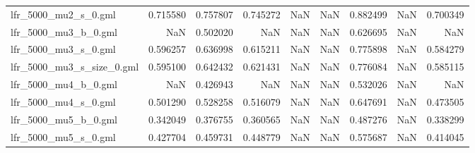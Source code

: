 \begin{tabular}{lrrrrrrrr}
lfr\_5000\_mu2\_s\_0.gml       &                            0.715580 &                       0.757807 &                          0.745272 &                           NaN &                             NaN &                     0.882499 &                                 NaN &                                0.700349 \\
lfr\_5000\_mu3\_b\_0.gml       &                                 NaN &                       0.502020 &                               NaN &                           NaN &                             NaN &                     0.626695 &                                 NaN &                                     NaN \\
lfr\_5000\_mu3\_s\_0.gml       &                            0.596257 &                       0.636998 &                          0.615211 &                           NaN &                             NaN &                     0.775898 &                                 NaN &                                0.584279 \\
lfr\_5000\_mu3\_s\_size\_0.gml  &                            0.595100 &                       0.642432 &                          0.621431 &                           NaN &                             NaN &                     0.776084 &                                 NaN &                                0.585115 \\
lfr\_5000\_mu4\_b\_0.gml       &                                 NaN &                       0.426943 &                               NaN &                           NaN &                             NaN &                     0.532026 &                                 NaN &                                     NaN \\
lfr\_5000\_mu4\_s\_0.gml       &                            0.501290 &                       0.528258 &                          0.516079 &                           NaN &                             NaN &                     0.647691 &                                 NaN &                                0.473505 \\
lfr\_5000\_mu5\_b\_0.gml       &                            0.342049 &                       0.376755 &                          0.360565 &                           NaN &                             NaN &                     0.487276 &                                 NaN &                                0.338299 \\
lfr\_5000\_mu5\_s\_0.gml       &                            0.427704 &                       0.459731 &                          0.448779 &                           NaN &                             NaN &                     0.575687 &                                 NaN &                                0.414045 \\

\end{tabular}
